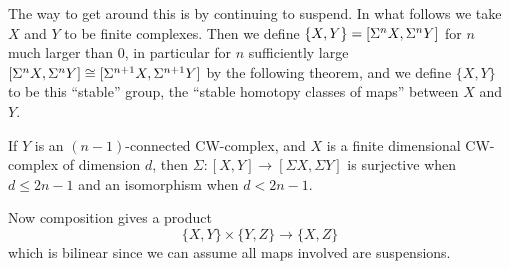 The way to get around this is by continuing to suspend.  In what follows we take $X$ and $Y$ to be finite complexes.  Then we define $\{X, Y\} = [\Sigma^n X, \Sigma^n Y]$ for $n$ much larger than 0, in particular for $n$ sufficiently large $[\Sigma^n X, \Sigma^n Y] \cong [\Sigma^{n+1} X, \Sigma^{n+1} Y]$ by the following theorem, and we define $\{X, Y\}$ to be this ``stable'' group, the ``stable homotopy classes of maps'' between $X$ and $Y$.
\begin{thm}
If $Y$ is an $(n-1)$-connected CW-complex, and $X$ is a finite dimensional CW-complex of dimension $d$, then $\Sigma:[X,Y]\to[\Sigma X,\Sigma Y]$ is surjective when $d\leq2n-1$ and an isomorphism when $d<2n-1$.
\end{thm}
Now composition gives a product
\[
\{X, Y\} \times \{Y, Z\} \to \{X, Z\}
\]
which is bilinear since we can assume all maps involved are suspensions.

